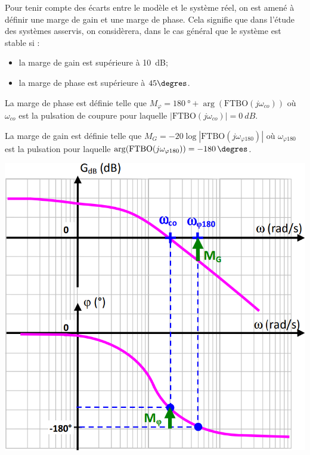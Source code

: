 \documentclass[10pt,fleqn]{article} %
\begin{document}
\begin{resultat}[Marges]
Pour tenir compte des écarts entre le modèle et le système réel, on est amené à définir une marge de gain et une marge de phase. Cela signifie que dans l'étude des systèmes asservis, on considèrera, dans le cas général que le système est stable si :
\begin{itemize}
\item la marge de gain est supérieure à \SI{10}{dB};
\item la marge de phase est supérieure à $45\degres$.
\end{itemize}
\end{resultat}

\begin{minipage}[c]{.58\linewidth}
\begin{defi}

La marge de phase est définie telle que $M_\varphi= \SI{180}{\degree} + \arg\left(\text{FTBO}(j\omega_{co})\right)$ où $\omega_{co}$ est la pulsation de coupure pour laquelle $|\text{FTBO}\left(j\omega_{co}\right)|=\SI{0}{dB}$.
\end{defi}

\begin{defi}
La marge de gain est définie telle
que $M_G = -20\log|\text{FTBO} (j\omega_{\varphi 180})|$
où $\omega_{\varphi 180}$ est la pulsation pour laquelle $\arg(\text{FTBO}(j\omega_{ \varphi 180}))= -\SI{180}{\degres}$.
\end{defi}
\end{minipage}\hfill
\begin{minipage}[c]{.4\linewidth}
\begin{center}
\includegraphics[width=.8\linewidth]{images/marges_fm}
\end{center}
\end{minipage}
\end{document}
